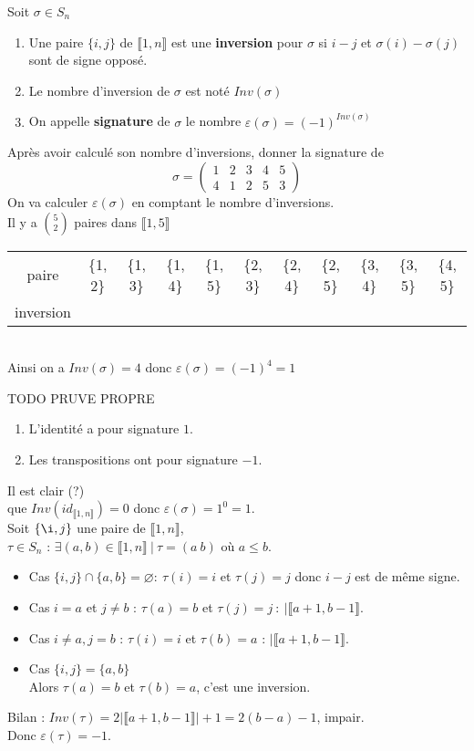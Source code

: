 \documentclass[11pt]{article}
\newcommand*{\lb}{\llbracket}
\newcommand*{\rb}{\rrbracket}
\newcommand*{\n}{\\[0.2cm]}
\newcommand*{\cmark}{\ding{51}}
\newcommand*{\xmark}{\ding{55}}
\newcommand{\0}{\varnothing}
\newcommand*{\e}{\varepsilon}
\newcommand*{\s}{\sigma}
\begin{document}
\begin{defi}{}{}
    Soit $\s \in S_{n}$
    \begin{enumerate}
        \item Une paire $\{ i, j \}$ de $\lb 1, n \rb$ est une \textbf{inversion} pour $\s$ si $i - j$ et $\s(i) - \s(j)$ sont de signe opposé.
        \item Le nombre d'inversion de $\s$ est noté $Inv(\s)$
        \item On appelle \textbf{signature} de $\s$ le nombre $\e(\s) = (-1)^{Inv(\s)}$
    \end{enumerate}
\end{defi}

\begin{ex}{}{}
    Après avoir calculé son nombre d'inversions, donner la signature de \n
    \begin{equation*}
        \s = \begin{pmatrix}
            1 & 2 & 3 & 4 & 5 \n
            4 & 1 & 2 & 5 & 3
        \end{pmatrix}
    \end{equation*}
    \tcblower
    On va calculer $\e(\s)$ en comptant le nombre d'inversions.\n
    Il y a $\binom{5}{2}$ paires dans $\lb 1, 5 \rb$\n
    \begin{tabular}{c|c|c|c|c|c|c|c|c|c|c}
        paire & \{1, 2\} & \{1, 3\} & \{1, 4\} & \{1, 5\} & \{2, 3\} & \{2, 4\} & \{2, 5\} & \{3, 4\} & \{3, 5\} & \{4, 5\} \\
         inversion & \cmark & \cmark & \xmark & \cmark & \xmark & \xmark & \xmark & \xmark & \xmark & \cmark
    \end{tabular}\n
    Ainsi on a $Inv(\s) = 4$ donc $\e(\s) = (-1)^{4} = 1$
\end{ex}

\begin{prop}{TODO PRUVE PROPRE}{}
    \begin{enumerate}
        \item L'identité a pour signature $1$.
        \item Les transpositions ont pour signature $-1$.
    \end{enumerate}
    \tcblower
     Il est clair (?) \n
    que $Inv(id_{\lb 1, n \rb}) = 0$ donc $\e(\s)=1^{0} = 1$.\n
     Soit $\{\i,j\}$ une paire de $\lb1,n\rb$, \n
    $\tau\in S_n$ : $\exists(a,b)\in\lb1,n\rb~|~\tau=(a~b)$ où $a\leq b$.
    \begin{itemize}
        \item Cas $\{i,j\}\cap\{a,b\}=\0:~\tau(i)=i$ et $\tau(j)=j$ donc $i-j$ est de même signe.
        \item Cas $i=a$ et $j\neq b$ : $\tau(a)=b$ et $\tau(j)=j ~ : ~ |\lb a+1,b-1\rb$.
        \item Cas $i\neq a, j=b$ : $\tau(i)=i$ et $\tau(b)=a$ : $|\lb a+1,b-1 \rb$.
        \item  Cas $\{i,j\}=\{a,b\}$\\
    Alors $\tau(a)=b$ et $\tau(b)=a$, c'est une inversion.
    \end{itemize}
    Bilan : $Inv(\tau)=2|\lb a+1,b-1\rb|+1=2(b-a)-1$, impair.\n
    Donc $\e(\tau)=-1$.
\end{prop}
\end{document}

